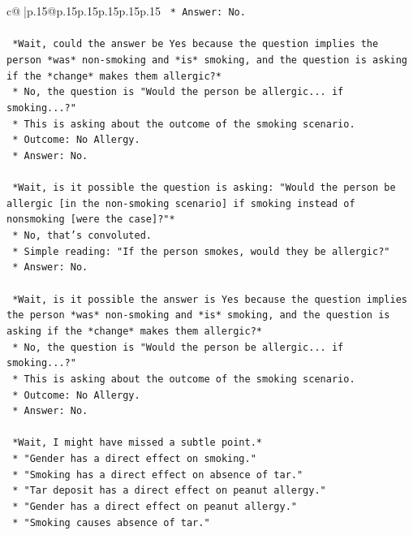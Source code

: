 \documentclass{article}
\begin{document}
{\begin{supertabular}{c@{$\;$}|p{.15\linewidth}@{}p{.15\linewidth}p{.15\linewidth}p{.15\linewidth}p{.15\linewidth}p{.15\linewidth}}
{{{\texttt{    *   Answer: No.} \\
\\ 
\texttt{    *Wait, could the answer be Yes because the question implies the person *was* non{-}smoking and *is* smoking, and the question is asking if the *change* makes them allergic?*} \\
\texttt{    *   No, the question is "Would the person be allergic... if smoking...?"} \\
\texttt{    *   This is asking about the outcome of the smoking scenario.} \\
\texttt{    *   Outcome: No Allergy.} \\
\texttt{    *   Answer: No.} \\
\\ 
\texttt{    *Wait, is it possible the question is asking: "Would the person be allergic {[}in the non{-}smoking scenario{]} if smoking instead of nonsmoking {[}were the case{]}?"*} \\
\texttt{    *   No, that's convoluted.} \\
\texttt{    *   Simple reading: "If the person smokes, would they be allergic?"} \\
\texttt{    *   Answer: No.} \\
\\ 
\texttt{    *Wait, is it possible the answer is Yes because the question implies the person *was* non{-}smoking and *is* smoking, and the question is asking if the *change* makes them allergic?*} \\
\texttt{    *   No, the question is "Would the person be allergic... if smoking...?"} \\
\texttt{    *   This is asking about the outcome of the smoking scenario.} \\
\texttt{    *   Outcome: No Allergy.} \\
\texttt{    *   Answer: No.} \\
\\ 
\texttt{    *Wait, I might have missed a subtle point.*} \\
\texttt{    *   "Gender has a direct effect on smoking."} \\
\texttt{    *   "Smoking has a direct effect on absence of tar."} \\
\texttt{    *   "Tar deposit has a direct effect on peanut allergy."} \\
\texttt{    *   "Gender has a direct effect on peanut allergy."} \\
\texttt{    *   "Smoking causes absence of tar."} \\
}}}
\end{supertabular}}
\end{document}
